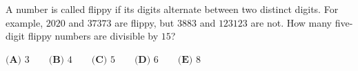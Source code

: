 A number is called flippy if its digits alternate between two distinct digits. For example, $2020$ and $37373$ are flippy, but $3883$ and $123123$ are not. How many five-digit flippy numbers are divisible by $15$?

$\textbf{(A) }3 \qquad \textbf{(B) }4 \qquad \textbf{(C) }5 \qquad \textbf{(D) }6 \qquad \textbf{(E) }8$
